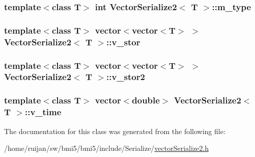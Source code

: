 \hypertarget{classVectorSerialize2_a7642e9343ecdbc62835356b89f9c9d2d}{
\subsubsection[{m\-\_\-type}]{\setlength{\rightskip}{0pt plus 5cm}template$<$class T$>$ int {\bf Vector\-Serialize2}$<$ T $>$\-::m\-\_\-type}}\label{classVectorSerialize2_a7642e9343ecdbc62835356b89f9c9d2d}
\hypertarget{classVectorSerialize2_a1606b8f8be4a619436a791c23ce0d644}{
\subsubsection[{v\-\_\-stor}]{\setlength{\rightskip}{0pt plus 5cm}template$<$class T$>$ vector$<$vector$<$T$>$ $>$ {\bf Vector\-Serialize2}$<$ T $>$\-::v\-\_\-stor}}\label{classVectorSerialize2_a1606b8f8be4a619436a791c23ce0d644}
\hypertarget{classVectorSerialize2_a9e681c82d96515f9adfce7cc7d6bf2cc}{
\subsubsection[{v\-\_\-stor2}]{\setlength{\rightskip}{0pt plus 5cm}template$<$class T$>$ vector$<$vector$<$T$>$ $>$ {\bf Vector\-Serialize2}$<$ T $>$\-::v\-\_\-stor2}}\label{classVectorSerialize2_a9e681c82d96515f9adfce7cc7d6bf2cc}
\hypertarget{classVectorSerialize2_a22a2c759bc2e39c739ee1010c7f1078c}{
\subsubsection[{v\-\_\-time}]{\setlength{\rightskip}{0pt plus 5cm}template$<$class T$>$ vector$<$double$>$ {\bf Vector\-Serialize2}$<$ T $>$\-::v\-\_\-time}}\label{classVectorSerialize2_a22a2c759bc2e39c739ee1010c7f1078c}


The documentation for this class was generated from the following file\-:\begin{DoxyCompactItemize}
\item 
/home/ruijan/sw/bmi5/bmi5/include/\-Serialize/\hyperlink{vectorSerialize2_8h}{vector\-Serialize2.\-h}\end{DoxyCompactItemize}

